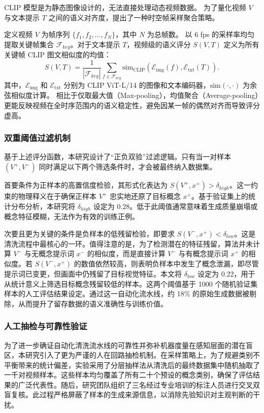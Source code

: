 CLIP 模型是为静态图像设计的，无法直接处理动态视频数据。
为了量化视频 $V$ 与文本提示 $T$ 之间的语义对齐度，提出了一种时空帧采样聚合策略。

定义视频 $V$ 为帧序列 $\{f_1, f_2, \dots, f_N\}$，其中 $N$ 为总帧数。
以 6 fps 的采样率均匀提取关键帧集合 $\mathcal{F}_{key}$。对于文本提示 $T$，视频级的语义评分 $S(V, T)$ 定义为所有关键帧 CLIP 图文相似度的均值：
\begin{equation}
S(V, T) = \frac{1}{|\mathcal{F}_{key}|} \sum_{f \in \mathcal{F}_{key}} \text{sim}_{\text{CLIP}}(\mathcal{E}_{\text{img}}(f), \mathcal{E}_{\text{txt}}(T)).
\end{equation}
其中，$\mathcal{E}_{\text{img}}$ 和 $\mathcal{E}_{\text{txt}}$ 分别为 CLIP ViT-L/14 的图像和文本编码器，$\text{sim}(\cdot, \cdot)$ 为余弦相似度计算。
相比于仅取最大值（Max-pooling），均值聚合（Average-pooling）更能反映视频在全时序范围内的语义稳定性，避免因某一帧的偶然对齐而导致评分虚高。

\subsubsection{双重阈值过滤机制}

基于上述评分函数，本研究设计了“正负双验”过滤逻辑。只有当一对样本 $(V^+, V^-)$ 同时满足以下两个筛选条件时，才会被最终纳入数据集。

首要条件为正样本的高置信度检验，其形式化表达为 $S(V^+, x^+) > \delta_{high}$。这一约束的物理释义在于确保正样本 $V^+$ 忠实地还原了目标概念 $x^+$。基于验证集上的统计分布分析，本研究将 $\delta_{high}$ 设定为 0.28。低于此阈值通常意味着生成质量崩塌或概念特征模糊，无法作为有效的训练正例。

次要且更为关键的条件是负样本的低残留检验，即要求 $S(V^-, x^+) < \delta_{low}$。这是清洗流程中最核心的一环。值得注意的是，为了检测潜在的特征残留，算法并未计算 $V^-$ 与无概念提示词 $x^-$ 的相似度，而是直接计算 $V^-$ 与有概念提示词 $x^+$ 的相似度。若 $S(V^-, x^+)$ 的数值依然较高，则表明负样本中发生了概念泄漏，即尽管提示词已变更，但画面中仍残留了目标视觉特征。本文将 $\delta_{low}$ 设定为 0.22，用于从统计意义上筛选目标概念残留较低的样本。这两个阈值基于 1000 个随机验证集样本的人工评估结果设定。通过这一自动化流水线，约 18\% 的原始生成数据被剔除，从而提升了留存数据的语义准确性与训练价值。

\subsubsection{人工抽检与可靠性验证}
为了进一步确证自动化清洗流水线的可靠性并弥补机器度量在感知层面的潜在盲区，本研究引入了更为严谨的人在回路抽检机制。在采样策略上，为了规避类别不平衡带来的统计偏差，实验采用了分层抽样法从清洗后的最终数据集中随机抽取了一千对视频样本。这些样本均匀覆盖了所有二十个预设的概念类别，确保了评估结果的广泛代表性。随后，研究团队组织了三名经过专业培训的标注人员进行交叉双盲复核。此过程严格屏蔽了样本的生成来源信息，以消除先验知识对主观判断的干扰。

